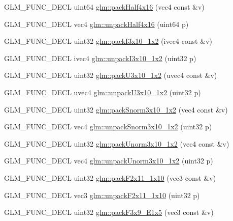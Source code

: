 \begin{DoxyCompactItemize}
G\+L\+M\+\_\+\+F\+U\+N\+C\+\_\+\+D\+E\+CL uint64 \hyperlink{group__gtc__packing_ga8104f0b719b7792491f2b789a6dd6f96}{glm\+::pack\+Half4x16} (vec4 const \&v)
\item 
G\+L\+M\+\_\+\+F\+U\+N\+C\+\_\+\+D\+E\+CL vec4 \hyperlink{group__gtc__packing_gaea526d6491ad40401eac34803984bf27}{glm\+::unpack\+Half4x16} (uint64 p)
\item 
G\+L\+M\+\_\+\+F\+U\+N\+C\+\_\+\+D\+E\+CL uint32 \hyperlink{group__gtc__packing_ga032e18fa5bc5b8f3897104aeb2f1e195}{glm\+::pack\+I3x10\+\_\+1x2} (ivec4 const \&v)
\item 
G\+L\+M\+\_\+\+F\+U\+N\+C\+\_\+\+D\+E\+CL ivec4 \hyperlink{group__gtc__packing_ga08bcd34cf9c34701d658dd861ee6e300}{glm\+::unpack\+I3x10\+\_\+1x2} (uint32 p)
\item 
G\+L\+M\+\_\+\+F\+U\+N\+C\+\_\+\+D\+E\+CL uint32 \hyperlink{group__gtc__packing_gaf656d8862628f96b20de7a36eaa1fe56}{glm\+::pack\+U3x10\+\_\+1x2} (uvec4 const \&v)
\item 
G\+L\+M\+\_\+\+F\+U\+N\+C\+\_\+\+D\+E\+CL uvec4 \hyperlink{group__gtc__packing_ga119aa2d7d55952f9dc4214390a6ffefc}{glm\+::unpack\+U3x10\+\_\+1x2} (uint32 p)
\item 
G\+L\+M\+\_\+\+F\+U\+N\+C\+\_\+\+D\+E\+CL uint32 \hyperlink{group__gtc__packing_ga0d4157cec37c0312216a7be1cc92df54}{glm\+::pack\+Snorm3x10\+\_\+1x2} (vec4 const \&v)
\item 
G\+L\+M\+\_\+\+F\+U\+N\+C\+\_\+\+D\+E\+CL vec4 \hyperlink{group__gtc__packing_ga8b8bb827a3743ca553d8702d3e337101}{glm\+::unpack\+Snorm3x10\+\_\+1x2} (uint32 p)
\item 
G\+L\+M\+\_\+\+F\+U\+N\+C\+\_\+\+D\+E\+CL uint32 \hyperlink{group__gtc__packing_ga2cf2d11b40bd48639110456fd74c2e33}{glm\+::pack\+Unorm3x10\+\_\+1x2} (vec4 const \&v)
\item 
G\+L\+M\+\_\+\+F\+U\+N\+C\+\_\+\+D\+E\+CL vec4 \hyperlink{group__gtc__packing_gaf69ace2b5e9234f8afb4e99c3df1193d}{glm\+::unpack\+Unorm3x10\+\_\+1x2} (uint32 p)
\item 
G\+L\+M\+\_\+\+F\+U\+N\+C\+\_\+\+D\+E\+CL uint32 \hyperlink{group__gtc__packing_ga8c2a0eeee677ca4dafd9e093d9e81062}{glm\+::pack\+F2x11\+\_\+1x10} (vec3 const \&v)
\item 
G\+L\+M\+\_\+\+F\+U\+N\+C\+\_\+\+D\+E\+CL vec3 \hyperlink{group__gtc__packing_ga8b9c7991eb021d95c778bf5c0b2f7824}{glm\+::unpack\+F2x11\+\_\+1x10} (uint32 p)
\item 
G\+L\+M\+\_\+\+F\+U\+N\+C\+\_\+\+D\+E\+CL uint32 \hyperlink{group__gtc__packing_ga0984f9598edc648d59a9643d9a61b121}{glm\+::pack\+F3x9\+\_\+\+E1x5} (vec3 const \&v)

\end{DoxyCompactItemize}
